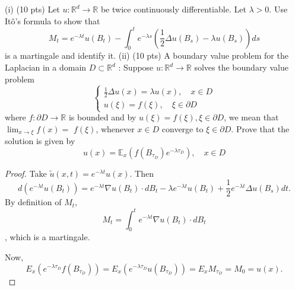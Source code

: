 \begin{problem}
	(i) (10 pts) Let $u: \mathbb{R}^d \rightarrow \mathbb{R}$ be twice continuously differentiable. Let $\lambda>0$. Use Itô's formula to show that
\[
M_t=e^{-\lambda t} u\left(B_t\right)-\int_0^t e^{-\lambda s}\left(\frac{1}{2} \Delta u\left(B_s\right)-\lambda u\left(B_s\right)\right) d s
\]
is a martingale and identify it.
(ii) (10 pts) A boundary value problem for the Laplacian in a domain $D \subset \mathbb{R}^d$ : Suppose $u: \mathbb{R}^d \rightarrow \mathbb{R}$ solves the boundary value problem
\[
\left\{\begin{array}{l}
\frac{1}{2} \Delta u(x)=\lambda u(x), \quad x \in D \\
u(\xi)=f(\xi), \quad \xi \in \partial D
\end{array}\right.
\]
where $f: \partial D \rightarrow \mathbb{R}$ is bounded and by $u(\xi)=f(\xi), \xi \in \partial D$, we mean that $\lim _{x \rightarrow \xi} f(x)=$ $f(\xi)$, whenever $x \in D$ converge to $\xi \in \partial D$. Prove that the solution is given by
\[
u(x)=\mathbb{E}_x\left(f\left(B_{\tau_D}\right) e^{-\lambda \tau_D}\right), \quad x \in D
\]
\end{problem}
\begin{proof}
	Take $\tilde u (x, t) = e^{- \lambda t} u(x)$. Then
	\[
		d\left( e^{- \lambda t} u(B_t) \right) 
		= e^{- \lambda t} \nabla u (B_t) \cdot  dB_t - \lambda e^{- \lambda t} u(B_t) + \frac{1}{2} e^{- \lambda t} \Delta u(B_s) d t
	.\] 
	By definition of $M_t$, 
	\[
		M_t = \int _0^t e^{- \lambda t} \nabla u(B_t) \cdot d B_t
	\] 
	, which is a martingale.

	Now, 
	\[
		E_x \left(  e^{- \lambda \tau_D} f(B_{\tau_D})  \right)  
		= E_x \left(  e^{- \lambda \tau_D} u(B_{\tau_D})  \right)  
		= E_x M_{\tau_D}
		= M_0
		= u(x)
	.\] 
\end{proof}




